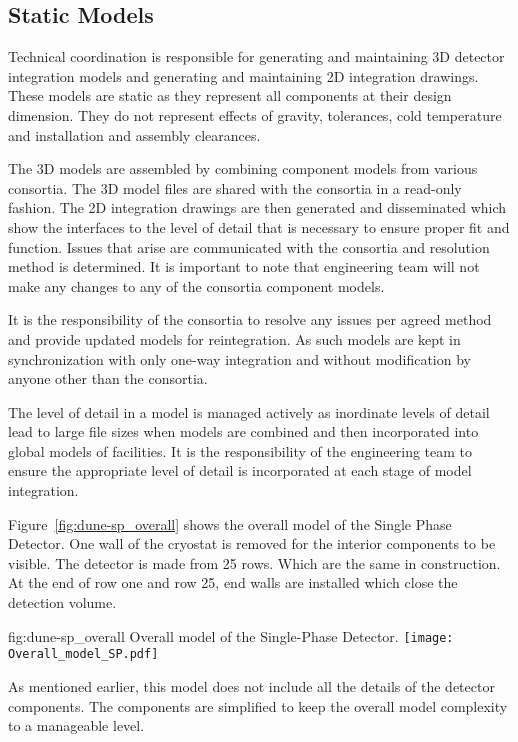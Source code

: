 \subsection{Static Models}
\label{sec:fdsp-coord-integ-static}
Technical coordination is responsible for generating and maintaining
3D detector integration models and generating and maintaining
2D integration drawings. These models are static as they represent all
components at their design dimension. They do not represent effects of
gravity, tolerances, cold temperature and installation and assembly
clearances.

The 3D models are assembled by combining component models from various
consortia. The 3D model files are shared with the consortia in a
read-only fashion. The 2D integration drawings are then generated and
disseminated which show the interfaces to the level of detail that is
necessary to ensure proper fit and function. Issues that arise are
communicated with the consortia and resolution method is
determined. It is important to note that  engineering team
will not make any changes to any of the consortia component models.

It is the responsibility of the consortia to resolve any issues per
agreed method and provide updated models for reintegration. As such
models are kept in synchronization with only one-way integration and
without modification by anyone other than the consortia.

The level of detail in a model is managed actively as inordinate
levels of detail lead to large file sizes when models are combined and
then incorporated into global models of facilities. It is the
responsibility of the  engineering team to ensure the
appropriate level of detail is incorporated at each stage of model
integration.

Figure~\ref{fig:dune-sp_overall} shows the overall model of the Single
Phase Detector. One wall of the cryostat is removed for the interior
components to be visible. The detector is made from 25 rows.  Which
are the same in construction. At the end of row one and row 25, end
walls are installed which close the detection volume.
\begin{dunefigure}{fig:dune-sp_overall}
  {Overall model of the Single-Phase Detector.}
  \texttt{[image: Overall\_model\_SP.pdf]}
\end{dunefigure}


As mentioned earlier, this model does not include all the details of
the detector components. The components are simplified to keep the
overall model complexity to a manageable level.

